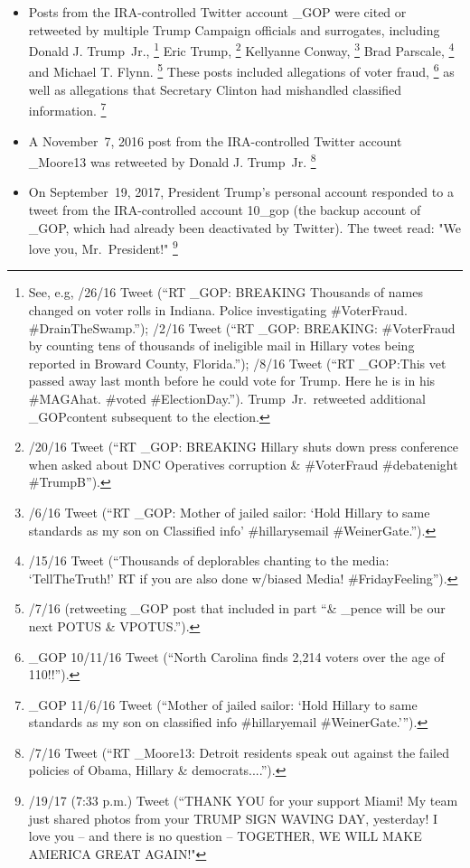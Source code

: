\begin{itemize}
    \item Posts from the IRA-controlled Twitter account \@TEN\_GOP were cited or retweeted by multiple Trump Campaign officials and surrogates, including Donald J. Trump~Jr.,%
    \footnote{See, e.g, /26/16 Tweet (“RT \@TEN\_GOP: BREAKING Thousands of names changed on voter rolls in Indiana.
    Police investigating \#VoterFraud. \#DrainTheSwamp.”);
    /2/16 Tweet (“RT \@TEN\_GOP: BREAKING: \#VoterFraud by counting tens of thousands of ineligible mail in Hillary votes being reported in Broward County, Florida.”);
    /8/16 Tweet (“RT \@TEN\_GOP:This vet passed away last month before he could vote for Trump.
    Here he is in his \#MAGAhat.
    \#voted \#ElectionDay.”). Trump~Jr.\ retweeted additional \@TEN\_GOPcontent subsequent to the election.}
    Eric Trump,%
    \footnote{/20/16 Tweet (“RT \@TEN\_GOP: BREAKING Hillary shuts down press conference when asked about DNC Operatives corruption \& \#VoterFraud \#debatenight \#TrumpB”).}
    Kellyanne Conway,%
    \footnote{/6/16 Tweet (“RT \@TEN\_GOP: Mother of jailed sailor: ‘Hold Hillary to same standards as my son on Classified info' \#hillarysemail \#WeinerGate.”).}
    Brad Parscale,%
    \footnote{/15/16 Tweet (“Thousands of deplorables chanting to the media: ‘TellTheTruth!' RT if you are also done w/biased Media! \#FridayFeeling”).}
    and Michael T. Flynn.%
    \footnote{/7/16 (retweeting \@TEN\_GOP post that included in part “\@realDonaldTrump \& \@mike\_pence will be our next POTUS \& VPOTUS.”).}
    These posts included allegations of voter fraud,%
    \footnote{\@TEN\_GOP 10/11/16 Tweet (“North Carolina finds 2,214 voters over the age of 110!!”).}
    as well as allegations that Secretary Clinton had mishandled classified information.%
    \footnote{\@TEN\_GOP 11/6/16 Tweet (“Mother of jailed sailor: ‘Hold Hillary to same standards as my son on classified info \#hillaryemail \#WeinerGate.'”).}
    \item A November~7, 2016 post from the IRA-controlled Twitter account \@Pamela\_Moore13 was retweeted by Donald J. Trump~Jr.%
    \footnote{/7/16 Tweet (“RT \@Pamela\_Moore13: Detroit residents speak out against the failed policies of Obama, Hillary \& democrats....”).}
    \item On September~19, 2017, President Trump's personal account \@realDonaldTrump responded to a tweet from the IRA-controlled account \@10\_gop (the backup account of \@TEN\_GOP, which had already been deactivated by Twitter). The tweet read: "We love you, Mr.~President!"%
    \footnote{/19/17 (7:33 p.m.) Tweet (“THANK YOU for your support Miami! My team just shared photos from your TRUMP SIGN WAVING DAY, yesterday! I love you -- and there is no question -- TOGETHER, WE WILL MAKE AMERICA GREAT AGAIN!"}
\end{itemize}


